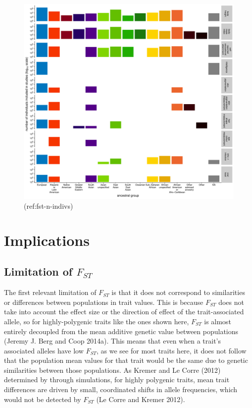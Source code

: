 \documentclass[
]{book}
\begin{document}
\begin{figure}
\includegraphics[width=1\linewidth]{figs/fst/20220324_n_individuals} \caption{(ref:fst-n-indivs)}\label{fig:fst-n-indivs}
\end{figure}

\hypertarget{implications}{%
\section{Implications}\label{implications}}

\hypertarget{limitation-of-f_st}{%
\subsection{\texorpdfstring{Limitation of \(F_{ST}\)}{Limitation of F\_\{ST\}}}\label{limitation-of-f_st}}

The first relevant limitation of \(F_{ST}\) is that it does not correspond to similarities or differences between populations in trait values. This is because \(F_{ST}\) does not take into account the effect size or the direction of effect of the trait-associated allele, so for highly-polygenic traits like the ones shown here, \(F_{ST}\) is almost entirely decoupled from the mean additive genetic value between populations (Jeremy J. Berg and Coop 2014a). This means that even when a trait's associated alleles have low \(F_{ST}\), as we see for most traits here, it does not follow that the population mean values for that trait would be the same due to genetic similarities between those populations. As Kremer and Le Corre (2012) determined by through simulations, for highly polygenic traits, mean trait differences are driven by small, coordinated shifts in allele frequencies, which would not be detected by \(F_{ST}\) (Le Corre and Kremer 2012).
\end{document}
